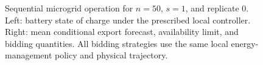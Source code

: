 \begin{figure}[t]
\caption{Sequential microgrid operation for $n=50$, $s=1$, and replicate 0. Left: battery state of charge under the prescribed local controller. Right: mean conditional export forecast, availability limit, and bidding quantities. All bidding strategies use the same local energy-management policy and physical trajectory.}
\label{fig:microgrid_trajectory}
\end{figure}
